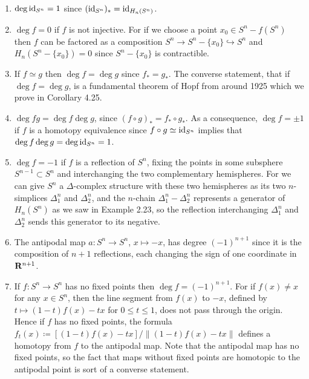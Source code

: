 \begin{enumerate}[label=(\arabic*)]
\item $\deg\operatorname{id}_{S^n}=1$ since $(\operatorname{id}_{S^n})_*=\operatorname{id}_{H_n(S^n)}$.
\item $\deg f=0$ if $f$ is not injective. For if we choose a point $x_0\in
  S^n\minus f(S^n)$ then $f$ can be factored as a composition $S^n\to
  S^n\minus\{x_0\}\hookrightarrow S^n$ and $H_n(S^n\minus\{x_0\})=0$ since
  $S^n\minus\{x_0\}$ is contractible.
\item If $f\simeq g$ then $\deg f=\deg g$ since $f_*=g_*$. The converse
  statement, that if $\deg f=\deg g$, is a fundamental theorem of Hopf from
  around 1925 which we prove in Corollary 4.25.
\item $\deg fg=\deg f\deg g$, since $(f\circ g)_*=f_*\circ g_*$. As a
  consequence, $\deg f=\pm 1$ if $f$ is a homotopy equivalence since
  $f\circ g\simeq \operatorname{id}_{S^n}$ implies that $\deg f\deg g=\deg\operatorname{id}_{S^n}=1$.
\item $\deg f=-1$ if $f$ is a reflection of $S^n$, fixing the points in
  some subsphere $S^{n-1}\subset S^n$ and interchanging the two
  complementary hemispheres. For we can give $S^n$ a $\Delta$-complex
  structure with these two hemispheres as its two $n$-simplices
  $\Delta_1^n$ and $\Delta_2^n$, and the $n$-chain $\Delta_1^n-\Delta_2^n$
  represents a generator of $H_n(S^n)$ as we saw in Example 2.23, so the
  reflection interchanging $\Delta_1^n$ and $\Delta_2^n$ sends this
  generator to its negative.
\item The antipodal map $a\colon S^n\to S^n$, $x\mapsto -x$, has degree
  $(-1)^{n+1}$ since it is the composition of $n+1$ reflections, each
  changing the sign of one coordinate in $\mathbf{R}^{n+1}$.
\item If $f\colon S^n\to S^n$ has no fixed points then $\deg
  f=(-1)^{n+1}$. For if $f(x)\neq x$ for any $x\in S^n$, then the line
  segment from $f(x)$ to $-x$, defined by $t\mapsto(1-t)f(x)-tx$ for $0\leq
  t\leq 1$, does not pass through the origin. Hence if $f$ has no fixed
  points, the formula $f_t(x)\coloneqq[(1-t)f(x)-tx]/\|(1-t)f(x)-tx\|$
  defines a homotopy from $f$ to the antipodal map. Note that the antipodal
  map has no fixed points, so the fact that maps without fixed points are
  homotopic to the antipodal point is sort of a converse statement.
\end{enumerate}


